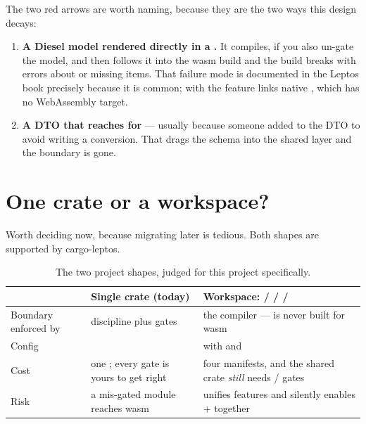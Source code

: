 The two red arrows are worth naming, because they are the two ways this design decays:

\begin{enumerate}
  \item \textbf{A Diesel model rendered directly in a .} It compiles, if you also
    un-gate the model, and then  follows it into the wasm build and the build breaks
    with errors about  or missing  items. That failure mode is documented in
    the Leptos book precisely because it is common;  with the  feature
    links native , which has no WebAssembly target.
  \item \textbf{A DTO that reaches for } --- usually because someone added
    \code{\#[diesel(table\_name = ...)]} to the DTO to avoid writing a conversion. That drags the
    schema into the shared layer and the boundary is gone.
\end{enumerate}

\section{One crate or a workspace?}

Worth deciding now, because migrating later is tedious. Both shapes are supported by
cargo-leptos.

\begin{table}[htbp]
\centering
\caption{The two project shapes, judged for this project specifically.}
\label{tab:shapes}
\small
\begin{tabular}{@{}L{0.14\textwidth}L{0.40\textwidth}L{0.40\textwidth}@{}}
\toprule
 & \textbf{Single crate (today)} & \textbf{Workspace:  /  /  / } \\
\midrule
Boundary enforced by & discipline plus  gates & the compiler ---  is never built for wasm \\
Config &  &  with  and  \\
Cost & one ; every gate is yours to get right & four manifests, and the shared crate \emph{still} needs / gates \\
Risk & a mis-gated module reaches wasm &  unifies features and silently enables + together \\
\bottomrule
\end{tabular}
\end{table}

